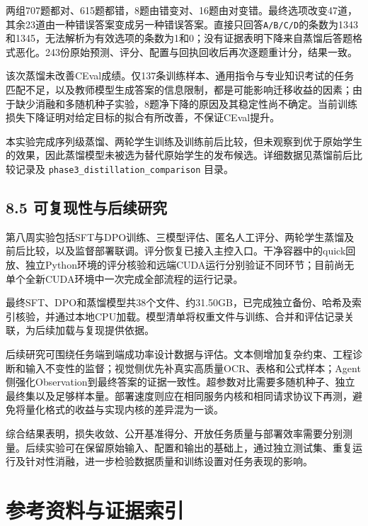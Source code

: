\documentclass[UTF8,fontset=fandol,a4paper,11pt]{ctexart}
\begin{document}
{两组707题都对、615题都错，8题由错变对、16题由对变错。最终选项改变47道，其余23道由一种错误答案变成另一种错误答案。直接只回答\nolinkurl{A/B/C/D}的条数为1343和1345，无法解析为有效选项的条数为1和0；没有证据表明下降来自蒸馏后答题格式恶化。243份原始预测、评分、配置与回执回收后再次逐题重计分，结果一致。}

该次蒸馏未改善CEval成绩。仅137条训练样本、通用指令与专业知识考试的任务匹配不足，以及教师模型生成答案的信息限制，都是可能影响迁移收益的因素；由于缺少消融和多随机种子实验，8题净下降的原因及其稳定性尚不确定。当前训练损失下降证明对给定目标的拟合有所改善，不保证CEval提升。

本实验完成序列级蒸馏、两轮学生训练及训练前后比较，但未观察到优于原始学生的效果，因此蒸馏模型未被选为替代原始学生的发布候选。详细数据见蒸馏前后比较记录及
\nolinkurl{phase3_distillation_comparison} 目录。

\subsection{8.5 可复现性与后续研究}\label{ux53efux590dux73b0ux6027ux4e0eux540eux7eedux7814ux7a76}

第八周实验包括SFT与DPO训练、三模型评估、匿名人工评分、两轮学生蒸馏及前后比较，以及监督部署联调。评分恢复已接入主控入口。干净容器中的quick回放、独立Python环境的评分核验和远端CUDA运行分别验证不同环节；目前尚无单个全新CUDA环境中一次完成全部流程的运行记录。

最终SFT、DPO和蒸馏模型共38个文件、约31.50GB，已完成独立备份、哈希及索引核验，并通过本地CPU加载。模型清单将权重文件与训练、合并和评估记录关联，为后续加载与复现提供依据。

后续研究可围绕任务端到端成功率设计数据与评估。文本侧增加复杂约束、工程诊断和输入不变性的监督；视觉侧优先补真实高质量OCR、表格和公式样本；Agent侧强化Observation到最终答案的证据一致性。超参数对比需要多随机种子、独立最终集以及足够样本量。部署速度则应在相同服务内核和相同请求协议下再测，避免将量化格式的收益与实现内核的差异混为一谈。

综合结果表明，损失收敛、公开基准得分、开放任务质量与部署效率需要分别测量。后续实验可在保留原始输入、配置和输出的基础上，通过独立测试集、重复运行及针对性消融，进一步检验数据质量和训练设置对任务表现的影响。

\section{参考资料与证据索引}\label{ux53c2ux8003ux8d44ux6599ux4e0eux8bc1ux636eux7d22ux5f15}
\end{document}
